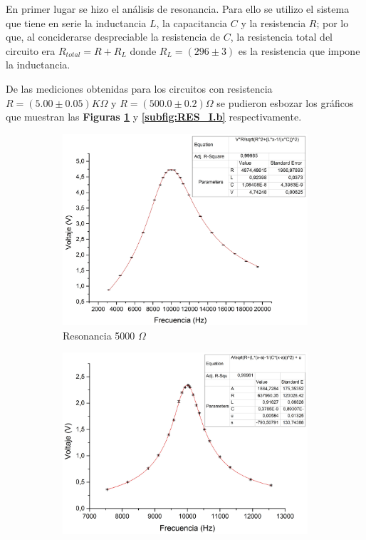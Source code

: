 \documentclass[11pt,a4paper]{article}
\begin{document}
En primer lugar se hizo el análisis de resonancia. Para ello se utilizo el sistema que tiene en serie la inductancia $L$, la capacitancia $C$ y la resistencia $R$; por lo que, al conciderarse despreciable la resistencia de $C$, la resistencia total del circuito era $R_{total} = R+R_{L}$ donde $R_{L} = (296 \pm 3)$ es la resistencia que impone la inductancia.

De las mediciones obtenidas para los circuitos con resistencia $R=(5.00 \pm 0.05)K\Omega$ y $R=(500.0 \pm 0.2)\Omega$ se pudieron esbozar los gráficos que muestran las \textbf{Figuras \ref{subfig:RES_I.a}} y \textbf{\ref{subfig:RES_I.b}} respectivamente.

\begin{figure}[h!]

\begin{subfigure}{0.5\textwidth}
\includegraphics[scale=0.3]{RLC_RES_5000_VvsF}
  \caption{Resonancia 5000 $\Omega$}
  \label{subfig:RES_I.a}
\end{subfigure}
\begin{subfigure}{0.5\textwidth}
\includegraphics[scale=0.32]{RLC_RES_500_VvsF}

\end{subfigure}
\end{figure}
\end{document}

